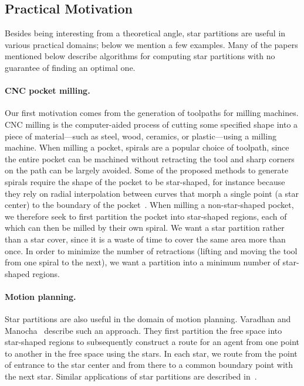 \documentclass[10pt,a4paper]{article}
\begin{document}
\subsection{Practical Motivation}\label{sec:practical}

Besides being interesting from a theoretical angle, star partitions are useful in various practical domains; below we mention a few examples.
Many of the papers mentioned below describe algorithms for computing star partitions with no guarantee of finding an optimal one.

\paragraph{CNC pocket milling.}
Our first motivation comes from the generation of toolpaths for milling machines.
CNC milling is the computer-aided process of cutting some specified shape into a piece of material---such as steel, wood, ceramics, or plastic---using a milling machine.
When milling a pocket, spirals are a popular choice of toolpath, since the entire pocket can be machined without retracting the tool and sharp corners on the path can be largely avoided.
Some of the proposed methods to generate spirals require the shape of the pocket to be star-shaped, for instance because they rely on radial interpolation between curves that morph a single point (a star center) to the boundary of the pocket~\cite{bieterman2003curvilinear,patel2019effect,banerjee2012process}.
When milling a non-star-shaped pocket, we therefore seek to first partition the pocket into star-shaped regions, each of which can then be milled by their own spiral.
We want a star partition rather than a star cover, since it is a waste of time to cover the same area more than once.
In order to minimize the number of retractions (lifting and moving the tool from one spiral to the next), we want a partition into a minimum number of star-shaped regions.

\paragraph{Motion planning.}
Star partitions are also useful in the domain of motion planning.
Varadhan and Manocha~\cite{varadhan2005star} describe such an approach. They first partition the free space into star-shaped regions to subsequently construct a route for an agent from one point to another in the free space using the stars.
In each star, we route from the point of entrance to the star center and from there to a common boundary point with the next star.
Similar applications of star partitions are described in~\cite{dobson2014sparse, SPBG:SPBG07:073-080, lien2009planning, zhang2006fast}.
\end{document}
